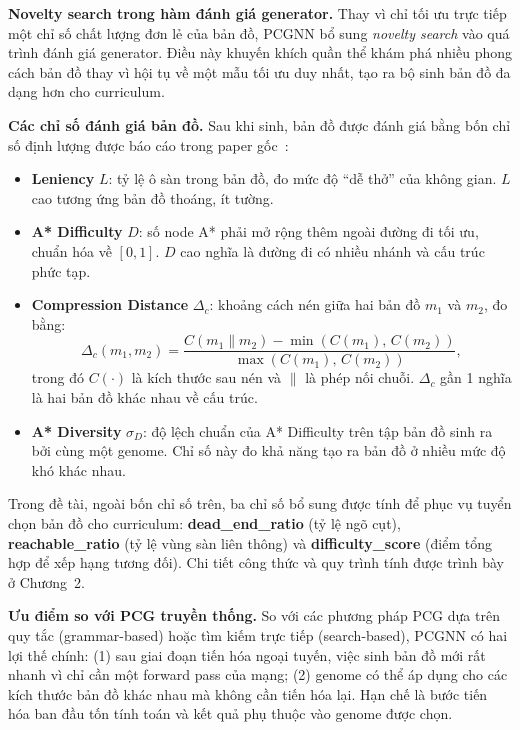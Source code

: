 \textbf{Novelty search trong hàm đánh giá generator.} Thay vì chỉ tối ưu trực tiếp một chỉ số chất lượng đơn lẻ của bản đồ, PCGNN bổ sung \textit{novelty search} vào quá trình đánh giá generator. Điều này khuyến khích quần thể khám phá nhiều phong cách bản đồ thay vì hội tụ về một mẫu tối ưu duy nhất, tạo ra bộ sinh bản đồ đa dạng hơn cho curriculum.

\textbf{Các chỉ số đánh giá bản đồ.} Sau khi sinh, bản đồ được đánh giá bằng bốn chỉ số định lượng được báo cáo trong paper gốc~\cite{Beukman2022}:

\begin{itemize}
    \item \textbf{Leniency} $L$: tỷ lệ ô sàn trong bản đồ, đo mức độ ``dễ thở'' của không gian. $L$ cao tương ứng bản đồ thoáng, ít tường.
    \item \textbf{A* Difficulty} $D$: số node A* phải mở rộng thêm ngoài đường đi tối ưu, chuẩn hóa về $[0,1]$. $D$ cao nghĩa là đường đi có nhiều nhánh và cấu trúc phức tạp.
    \item \textbf{Compression Distance} $\Delta_c$: khoảng cách nén giữa hai bản đồ $m_1$ và $m_2$, đo bằng:
        \begin{equation}
            \Delta_c(m_1, m_2) = \frac{C(m_1 \| m_2) - \min(C(m_1),\, C(m_2))}{\max(C(m_1),\, C(m_2))},
            \label{eq:ncd}
        \end{equation}
        trong đó $C(\cdot)$ là kích thước sau nén và $\|$ là phép nối chuỗi. $\Delta_c$ gần 1 nghĩa là hai bản đồ khác nhau về cấu trúc.
    \item \textbf{A* Diversity} $\sigma_D$: độ lệch chuẩn của A* Difficulty trên tập bản đồ sinh ra bởi cùng một genome. Chỉ số này đo khả năng tạo ra bản đồ ở nhiều mức độ khó khác nhau.
\end{itemize}

Trong đề tài, ngoài bốn chỉ số trên, ba chỉ số bổ sung được tính để phục vụ tuyển chọn bản đồ cho curriculum: \textbf{dead\_end\_ratio} (tỷ lệ ngõ cụt), \textbf{reachable\_ratio} (tỷ lệ vùng sàn liên thông) và \textbf{difficulty\_score} (điểm tổng hợp để xếp hạng tương đối). Chi tiết công thức và quy trình tính được trình bày ở Chương~2.

\textbf{Ưu điểm so với PCG truyền thống.} So với các phương pháp PCG dựa trên quy tắc (grammar-based) hoặc tìm kiếm trực tiếp (search-based), PCGNN có hai lợi thế chính: (1) sau giai đoạn tiến hóa ngoại tuyến, việc sinh bản đồ mới rất nhanh vì chỉ cần một forward pass của mạng; (2) genome có thể áp dụng cho các kích thước bản đồ khác nhau mà không cần tiến hóa lại. Hạn chế là bước tiến hóa ban đầu tốn tính toán và kết quả phụ thuộc vào genome được chọn.

